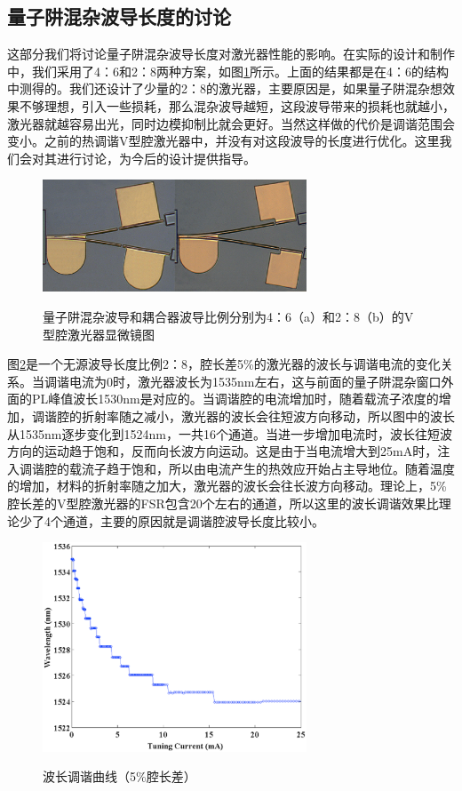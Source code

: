 \documentclass{ZJUthesis}
\begin{document}
\subsection{量子阱混杂波导长度的讨论}

这部分我们将讨论量子阱混杂波导长度对激光器性能的影响。在实际的设计和制作中，我们采用了4：6和2：8两种方案，如图\ref{fig_20p}所示。上面的结果都是在4：6的结构中测得的。我们还设计了少量的2：8的激光器，主要原因是，如果量子阱混杂想效果不够理想，引入一些损耗，那么混杂波导越短，这段波导带来的损耗也就越小，激光器就越容易出光，同时边模抑制比就会更好。当然这样做的代价是调谐范围会变小。之前的热调谐V型腔激光器中，并没有对这段波导的长度进行优化。这里我们会对其进行讨论，为今后的设计提供指导。

\begin{figure}[!ht]
  \centering
  \includegraphics[width=0.7\textwidth]{./Pictures/20p.eps}\\
  \caption{量子阱混杂波导和耦合器波导比例分别为4：6（a）和2：8（b）的V型腔激光器显微镜图}
  \label{fig_20p}
\end{figure}

图\ref{fig_20p1}是一个无源波导长度比例2：8，腔长差5\%的激光器的波长与调谐电流的变化关系。当调谐电流为0时，激光器波长为1535nm左右，这与前面的量子阱混杂窗口外面的PL峰值波长1530nm是对应的。当调谐腔的电流增加时，随着载流子浓度的增加，调谐腔的折射率随之减小，激光器的波长会往短波方向移动，所以图中的波长从1535nm逐步变化到1524nm，一共16个通道。当进一步增加电流时，波长往短波方向的运动趋于饱和，反而向长波方向运动。这是由于当电流增大到25mA时，注入调谐腔的载流子趋于饱和，所以由电流产生的热效应开始占主导地位。随着温度的增加，材料的折射率随之加大，激光器的波长会往长波方向移动。理论上，5\%腔长差的V型腔激光器的FSR包含20个左右的通道，所以这里的波长调谐效果比理论少了4个通道，主要的原因就是调谐腔波导长度比较小。

\begin{figure}[!ht]
  \centering
  \includegraphics[width=0.7\textwidth]{./Pictures/20p1.eps}\\
  \caption{波长调谐曲线（5\%腔长差）}
  \label{fig_20p1}
\end{figure}
\end{document}
